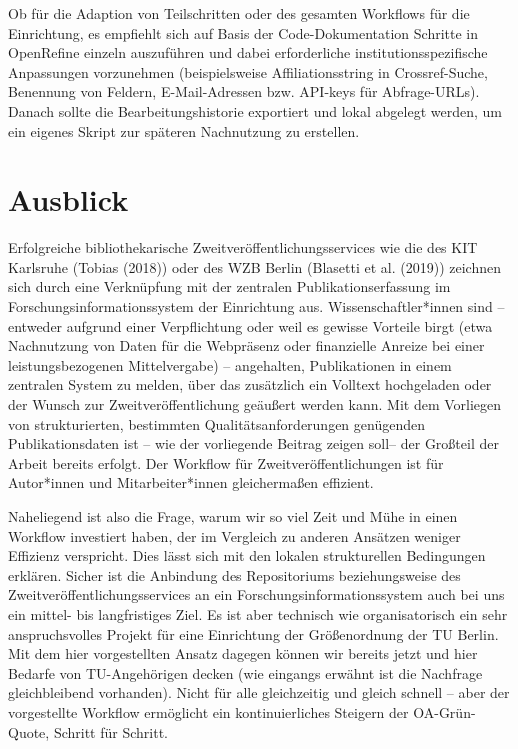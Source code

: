 \documentclass[a4paper,
fontsize=11pt,
oneside,
numbers=noperiodatend,
parskip=half-,
bibliography=totoc,
final
]{scrartcl}
\begin{document}
Ob für die Adaption von Teilschritten oder des gesamten Workflows für
die Einrichtung, es empfiehlt sich auf Basis der Code-Dokumentation
Schritte in OpenRefine einzeln auszuführen und dabei erforderliche
institutionsspezifische Anpassungen vorzunehmen (beispielsweise
Affiliationsstring in Crossref-Suche, Benennung von Feldern,
E-Mail-Adressen bzw. API-keys für Abfrage-URLs). Danach sollte die
Bearbeitungshistorie exportiert und lokal abgelegt werden, um ein
eigenes Skript zur späteren Nachnutzung zu erstellen.

\hypertarget{ausblick}{%
\section{Ausblick}\label{ausblick}}

Erfolgreiche bibliothekarische Zweitveröffentlichungsservices wie die
des KIT Karlsruhe (Tobias (2018)) oder des WZB Berlin (Blasetti et al.
(2019)) zeichnen sich durch eine Verknüpfung mit der zentralen
Publikationserfassung im Forschungsinformationssystem der Einrichtung
aus. Wissenschaftler*innen sind -- entweder aufgrund einer Verpflichtung
oder weil es gewisse Vorteile birgt (etwa Nachnutzung von Daten für die
Webpräsenz oder finanzielle Anreize bei einer leistungsbezogenen
Mittelvergabe) -- angehalten, Publikationen in einem zentralen System zu
melden, über das zusätzlich ein Volltext hochgeladen oder der Wunsch zur
Zweitveröffentlichung geäußert werden kann. Mit dem Vorliegen von
strukturierten, bestimmten Qualitätsanforderungen genügenden
Publikationsdaten ist -- wie der vorliegende Beitrag zeigen soll-- der
Großteil der Arbeit bereits erfolgt. Der Workflow für
Zweitveröffentlichungen ist für Autor*innen und Mitarbeiter*innen
gleichermaßen effizient.

Naheliegend ist also die Frage, warum wir so viel Zeit und Mühe in einen
Workflow investiert haben, der im Vergleich zu anderen Ansätzen weniger
Effizienz verspricht. Dies lässt sich mit den lokalen strukturellen
Bedingungen erklären. Sicher ist die Anbindung des Repositoriums
beziehungsweise des Zweitveröffentlichungsservices an ein
Forschungsinformationssystem auch bei uns ein mittel- bis langfristiges
Ziel. Es ist aber technisch wie organisatorisch ein sehr anspruchsvolles
Projekt für eine Einrichtung der Größenordnung der TU Berlin. Mit dem
hier vorgestellten Ansatz dagegen können wir bereits jetzt und hier
Bedarfe von TU-Angehöri\-gen decken (wie eingangs erwähnt ist die
Nachfrage gleichbleibend vorhanden). Nicht für alle gleichzeitig und
gleich schnell -- aber der vorgestellte Workflow ermöglicht ein
kontinuierliches Steigern der OA-Grün-Quote, Schritt für Schritt.
\end{document}

